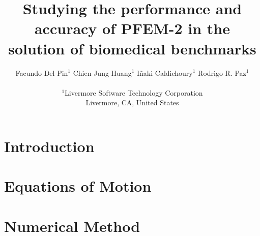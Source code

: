 \documentclass{article}
\begin{document}
\title{Studying the performance and accuracy of PFEM-2 in the solution of biomedical benchmarks}
\author{Facundo Del Pin$^1$   Chien-Jung Huang$^{1}$  
  I\~naki Caldichoury$^1$ Rodrigo R. Paz$^1$ \\  \\
$^1$Livermore Software Technology Corporation\\ Livermore,  CA, United
States
}


\maketitle

\begin{abstract}

\end{abstract}


\section{Introduction}


\section{Equations of Motion}


\section{Numerical Method}


\begin{thebibliography}{9}
  
\end{thebibliography}
\end{document}
